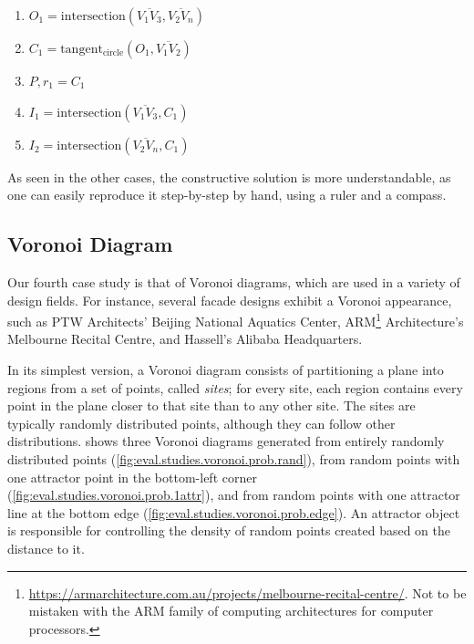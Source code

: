 \begin{enumerate}
  \item $O_1 = \mathrm{intersection}\left(\overline{V_1 V_3}, \overline{V_2
  V_n}\right)$
  \item $C_1 = \mathrm{tangent_{circle}}\left(O_1, \overline{V_1 V_2}\right)$
  \item $P,r_1 = C_1$
  \item $I_1 = \mathrm{intersection}\left(\overline{V_1 V_3}, C_1\right)$
  \item $I_2 = \mathrm{intersection}\left(\overline{V_2 V_n}, C_1\right)$
\end{enumerate}

As seen in the other cases, the constructive solution is more understandable, as
one can easily reproduce it step-by-step by hand, using a ruler and a compass.

\subsection{Voronoi Diagram}%
\label{sec:eval.studies.voronoi}

Our fourth case study is that of Voronoi diagrams, which are used in a variety
of design fields.  For instance, several facade designs exhibit a Voronoi
appearance, such as PTW Architects' Beijing National Aquatics Center,
ARM\footnote{\url{https://armarchitecture.com.au/projects/melbourne-recital-centre/}.
Not to be mistaken with the ARM family of computing architectures for computer
processors.} Architecture's Melbourne Recital Centre, and Hassell's Alibaba
Headquarters.

In its simplest version, a Voronoi diagram consists of partitioning a plane into
regions from a set of points, called \textit{sites}; for every site, each region
contains every point in the plane closer to that site than to any other site.
The sites are typically randomly distributed points, although they can follow
other distributions.   shows three Voronoi
diagrams generated from entirely randomly distributed points
(\cref{fig:eval.studies.voronoi.prob.rand}), from random points with one
attractor point in the bottom-left corner
(\cref{fig:eval.studies.voronoi.prob.1attr}), and from random points with one
attractor line at the bottom edge (\cref{fig:eval.studies.voronoi.prob.edge}).
An attractor object is responsible for controlling the density of random points
created based on the distance to it.


